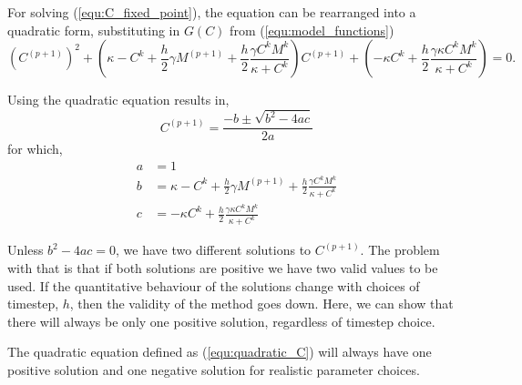 For solving (\ref{equ:C_fixed_point}), the equation can be rearranged into a quadratic form, substituting in $G(C)$ from (\ref{equ:model_functions})
\begin{equation} \label{equ:quadratic_C}
  \left(C^{(p+1)}\right)^2 + \left( \kappa - C^k + \frac{h}{2} \gamma M^{(p+1)} + \frac{h}{2} \frac{ \gamma C^k M^k}{\kappa + C^k} \right) C^{(p+1)} + \left( -\kappa C^k + \frac{h}{2} \frac{\gamma \kappa C^k M^k}{\kappa + C^k} \right) = 0.
\end{equation}

Using the quadratic equation results in, 
  \begin{equation} \label{eq:Cquad}
    C^{(p+1)} = \frac{-b \pm \sqrt{b^2 - 4ac}}{2a}
  \end{equation}  
  for which, 
  \begin{equation} \begin{aligned} \label{para:abc}
    a &= 1\\
    b &= \kappa - C^k + \frac{h}{2} \gamma M^{(p+1)} + \frac{h}{2} \frac{\gamma C^k M^k}{\kappa + C^k} \\
    c &= -\kappa C^k + \frac{h}{2} \frac{\gamma \kappa C^k M^k}{\kappa + C^k}
  \end{aligned}  \end{equation}

Unless $b^2 - 4ac = 0$, we have two different solutions to $C^{(p+1)}$. 
The problem with that is that if both solutions are positive we have two valid values to be used. 
If the quantitative behaviour of the solutions change with choices of timestep, $h$, then the validity of the method goes down.
Here, we can show that there will always be only one positive solution, regardless of timestep choice.

\begin{prop}
  The quadratic equation defined as (\ref{equ:quadratic_C}) will always have one positive solution and one negative solution for realistic parameter choices.
\end{prop}

